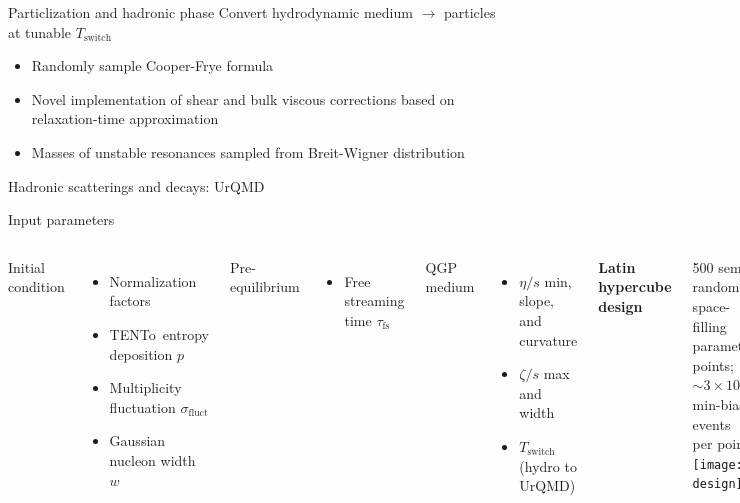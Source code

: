 \documentclass{beamer}
\newcommand{\trento}{T\raisebox{-.5ex}{R}ENTo}
\begin{document}
\begin{frame}[t]{Particlization and hadronic phase}
  \medskip
  Convert hydrodynamic medium $\rightarrow$ particles at tunable $T_\text{switch}$
  \begin{itemize}
    \item Randomly sample Cooper-Frye formula
    \item Novel implementation of shear and bulk viscous corrections based on relaxation-time approximation
    \item Masses of unstable resonances sampled from Breit-Wigner distribution
  \end{itemize}
  \bigskip
  Hadronic scatterings and decays: UrQMD
\end{frame}


\begin{frame}{Input parameters}
  \begin{columns}
    Initial condition
    \begin{itemize}
      \item Normalization factors
      \item \trento\ entropy deposition $p$
      \item Multiplicity fluctuation $\sigma_\text{fluct}$
      \item Gaussian nucleon width $w$
    \end{itemize}
    \medskip
    Pre-equilibrium
    \begin{itemize}
      \item Free streaming time $\tau_\text{fs}$
    \end{itemize}
    \medskip
    QGP medium
    \begin{itemize}
      \item $\eta/s$ min, slope, and curvature
      \item $\zeta/s$ max and width
      \item $T_\text{switch}$ (hydro to UrQMD)
    \end{itemize}
    \begin{center}
      \textbf{Latin hypercube design}
    \end{center}
    500 semi-random, space-filling parameter points;
    ${\sim}3 \times 10^4$ min-bias events per point \\[1em]
    \texttt{[image: design]}
  \end{columns}
\end{frame}
\end{document}
